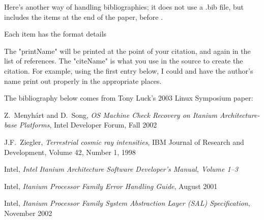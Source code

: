 
Here's another way of handling bibliographies; it does
not use a .bib file, but includes the items at the end
of the paper, before .

Each item has the format
 details

The "printName" will be printed at the point of your citation,
and again in the list of references.  The "citeName" is what
you use in the source to create the citation.  For example,
using the first entry below, I could \cite{menyhart} and
have the author's name print out properly in the appropriate
places.

The bibliography below comes from Tony Luck's 2003 Linux
Symposium paper:


\begin{thebibliography}{99}
\raggedright
{} Z.\ Menyh\'{a}rt and D.\ Song,
{\em OS Machine Check Recovery on Itanium Architecture-base Platforms},
Intel Developer Forum, Fall 2002

 J.F.\ Ziegler,
{\em Terrestrial cosmic ray intensities},
IBM Journal of Research and Development, Volume 42, Number 1, 1998

 Intel,
{\em Intel Itanium Architecture Software Developer's Manual, Volume 1--3}

 Intel,
{\em Itanium Processor Family Error Handling Guide}, August 2001

 Intel,
{\em Itanium Processor Family System Abstraction Layer (SAL) Specification}, November 2002

\end{thebibliography}



